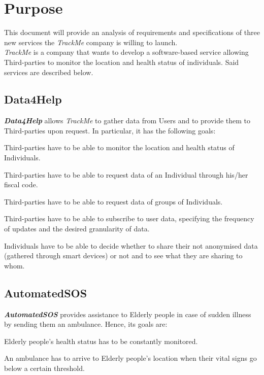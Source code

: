 \section{Purpose}
    This document will provide an analysis of requirements and specifications of three new services the \emph{TrackMe} company is willing to launch.\\
    \emph{TrackMe} is a company that wants to develop a software-based service allowing Third-parties to monitor the location and health status of individuals.
    Said services are described below.

\subsection{Data4Help}
    \textbf{\emph{Data4Help}} allows \emph{TrackMe} to gather data from Users and to provide them to Third-parties upon request. In particular, it has the following goals:
    \begin{enumerate}[label={[}G1.\arabic*{]}, leftmargin=*]
        \item \label{goal1 : monitoring} Third-parties have to be able to monitor the location and health status of Individuals.
        \begin{enumerate}[label={[}G1.\arabic{enumi}.\arabic*{]}, leftmargin=*]
            \item \label{goal1 : individual monitoring}Third-parties have to be able to request data of an Individual through his/her fiscal code.
            \item \label{goal1 : group monitoring} Third-parties have to be able to request data of groups of Individuals.
            \item \label{goal1 : subscription} Third-parties have to be able to subscribe to user data, specifying the frequency of updates and the desired granularity of data.
        \end{enumerate}
        \item \label{goal1: individual privacy} Individuals have to be able to decide whether to share their not anonymised data (gathered through smart devices) or not and to see what they are sharing to whom.
    \end{enumerate}

\subsection{AutomatedSOS}    
    \textbf{\emph{AutomatedSOS}} provides assistance to Elderly people in case of sudden illness by sending them an ambulance. Hence, its goals are:
    \begin{enumerate}[label={[}G2.\arabic*{]}, leftmargin=*]
        \item \label{goal2 : status monitorin} Elderly people's health status has to be constantly monitored.
        \item \label{goal2 : ambulance} An ambulance has to arrive to Elderly people's location when their vital signs go below a certain threshold.
    \end{enumerate}
    

